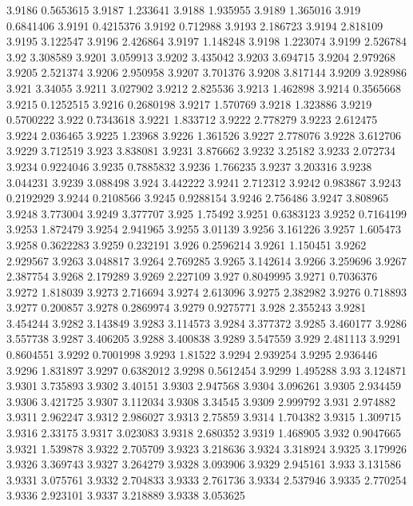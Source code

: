 3.9186  0.5653615
3.9187  1.233641
3.9188  1.935955
3.9189  1.365016
3.919  0.6841406
3.9191  0.4215376
3.9192  0.712988
3.9193  2.186723
3.9194  2.818109
3.9195  3.122547
3.9196  2.426864
3.9197  1.148248
3.9198  1.223074
3.9199  2.526784
3.92  3.308589
3.9201  3.059913
3.9202  3.435042
3.9203  3.694715
3.9204  2.979268
3.9205  2.521374
3.9206  2.950958
3.9207  3.701376
3.9208  3.817144
3.9209  3.928986
3.921  3.34055
3.9211  3.027902
3.9212  2.825536
3.9213  1.462898
3.9214  0.3565668
3.9215  0.1252515
3.9216  0.2680198
3.9217  1.570769
3.9218  1.323886
3.9219  0.5700222
3.922  0.7343618
3.9221  1.833712
3.9222  2.778279
3.9223  2.612475
3.9224  2.036465
3.9225  1.23968
3.9226  1.361526
3.9227  2.778076
3.9228  3.612706
3.9229  3.712519
3.923  3.838081
3.9231  3.876662
3.9232  3.25182
3.9233  2.072734
3.9234  0.9224046
3.9235  0.7885832
3.9236  1.766235
3.9237  3.203316
3.9238  3.044231
3.9239  3.088498
3.924  3.442222
3.9241  2.712312
3.9242  0.983867
3.9243  0.2192929
3.9244  0.2108566
3.9245  0.9288154
3.9246  2.756486
3.9247  3.808965
3.9248  3.773004
3.9249  3.377707
3.925  1.75492
3.9251  0.6383123
3.9252  0.7164199
3.9253  1.872479
3.9254  2.941965
3.9255  3.01139
3.9256  3.161226
3.9257  1.605473
3.9258  0.3622283
3.9259  0.232191
3.926  0.2596214
3.9261  1.150451
3.9262  2.929567
3.9263  3.048817
3.9264  2.769285
3.9265  3.142614
3.9266  3.259696
3.9267  2.387754
3.9268  2.179289
3.9269  2.227109
3.927  0.8049995
3.9271  0.7036376
3.9272  1.818039
3.9273  2.716694
3.9274  2.613096
3.9275  2.382982
3.9276  0.718893
3.9277  0.200857
3.9278  0.2869974
3.9279  0.9275771
3.928  2.355243
3.9281  3.454244
3.9282  3.143849
3.9283  3.114573
3.9284  3.377372
3.9285  3.460177
3.9286  3.557738
3.9287  3.406205
3.9288  3.400838
3.9289  3.547559
3.929  2.481113
3.9291  0.8604551
3.9292  0.7001998
3.9293  1.81522
3.9294  2.939254
3.9295  2.936446
3.9296  1.831897
3.9297  0.6382012
3.9298  0.5612454
3.9299  1.495288
3.93  3.124871
3.9301  3.735893
3.9302  3.40151
3.9303  2.947568
3.9304  3.096261
3.9305  2.934459
3.9306  3.421725
3.9307  3.112034
3.9308  3.34545
3.9309  2.999792
3.931  2.974882
3.9311  2.962247
3.9312  2.986027
3.9313  2.75859
3.9314  1.704382
3.9315  1.309715
3.9316  2.33175
3.9317  3.023083
3.9318  2.680352
3.9319  1.468905
3.932  0.9047665
3.9321  1.539878
3.9322  2.705709
3.9323  3.218636
3.9324  3.318924
3.9325  3.179926
3.9326  3.369743
3.9327  3.264279
3.9328  3.093906
3.9329  2.945161
3.933  3.131586
3.9331  3.075761
3.9332  2.704833
3.9333  2.761736
3.9334  2.537946
3.9335  2.770254
3.9336  2.923101
3.9337  3.218889
3.9338  3.053625
